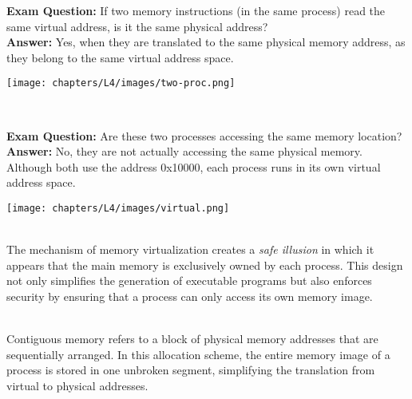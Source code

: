 \documentclass[../../compsys.tex]{subfiles}
\begin{document}
\noindent
\begin{minipage}{0.45\textwidth}
\textbf{Exam Question:} If two memory instructions (in the same process) read the same virtual address, is it the same physical address? \\[3px]
\textbf{Answer:} Yes, when they are translated to the same physical memory address, as they belong to the same virtual address space.
\end{minipage}%
\hfill
\vline
\hfill
\begin{minipage}{0.45\textwidth}
\begin{center}
    \texttt{[image: chapters/L4/images/two-proc.png]}
\end{center}
\end{minipage}
\\[10px]

\noindent
\begin{minipage}{0.45\textwidth}
\textbf{Exam Question:} Are these two processes accessing the same memory location? \\[3px]
\textbf{Answer:} No, they are not actually accessing the same physical memory. Although both use the address 0x10000, each process runs in its own virtual address space. 
\end{minipage}%
\hfill
\vline
\hfill
\begin{minipage}{0.45\textwidth}
\begin{center}
    \texttt{[image: chapters/L4/images/virtual.png]}
\end{center}
\end{minipage}\\[14px]

The mechanism of memory virtualization creates a \emph{safe illusion} in which it appears that the main memory is exclusively owned by each process. This design not only simplifies the generation of executable programs but also enforces security by ensuring that a process can only access its own memory image.

\begin{definition}
\leavevmode\\[2px]
Contiguous memory refers to a block of physical memory addresses that are sequentially arranged. In this allocation scheme, the entire memory image of a process is stored in one unbroken segment, simplifying the translation from virtual to physical addresses.
\end{definition}
\end{document}
